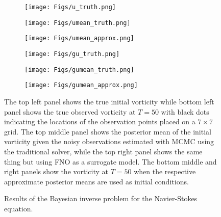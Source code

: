 \begin{figure}[ht]
    \centering
    \begin{subfigure}[b]{0.32\textwidth}
        \texttt{[image: Figs/u\_truth.png]}
    \end{subfigure}
    \begin{subfigure}[b]{0.32\textwidth}
        \texttt{[image: Figs/umean\_truth.png]}
    \end{subfigure}
    \begin{subfigure}[b]{0.32\textwidth}
        \texttt{[image: Figs/umean\_approx.png]}
    \end{subfigure}
    
    \begin{subfigure}[b]{0.32\textwidth}
        \texttt{[image: Figs/gu\_truth.png]}
    \end{subfigure}
    \begin{subfigure}[b]{0.32\textwidth}
        \texttt{[image: Figs/gumean\_truth.png]}
    \end{subfigure}
    \begin{subfigure}[b]{0.32\textwidth}
        \texttt{[image: Figs/gumean\_approx.png]}
    \end{subfigure}
        \caption{Results of the Bayesian inverse problem for the Navier-Stokes equation. } 
    \label{fig:baysian} 
\small{ The top left panel shows the true initial vorticity while bottom left panel shows the true observed vorticity at $T=50$ with black dots indicating the locations of the observation points placed on a $7 \times 7$ grid. The top middle panel shows the posterior mean of the initial vorticity given the noisy observations estimated with MCMC using the traditional solver, while the top right panel shows the same thing but using FNO as a surrogate model. The bottom middle and right panels show the vorticity at $T=50$ when the respective approximate posterior means are used as initial conditions. }
\end{figure}